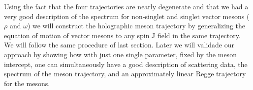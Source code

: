 \documentclass[a4paper,12pt]{article}
\begin{document}
Using the fact that the four trajectories are nearly degenerate and that we had a very good description of the spectrum for non-singlet and singlet vector mesons ($\rho$ and $\omega$) we will construct the holographic meson trajectory by generalizing the equation of motion of vector mesons to any spin J field in the same trajectory. We will follow the same procedure of last section. Later we will validade our approach by showing how with just one single parameter, fixed by the meson intercept, one can simultaneously have a good description of scattering data, the spectrum of the meson trajectory, and an approximately linear Regge trajectory for the mesons.



\end{document}
